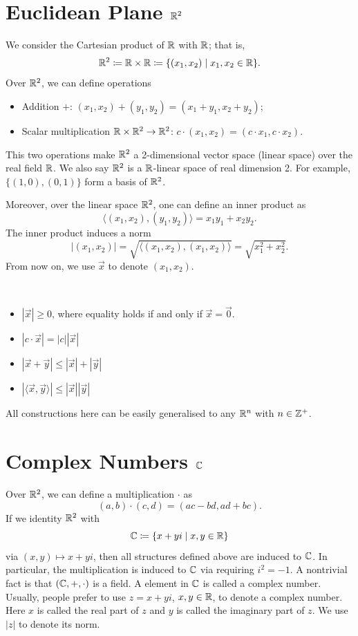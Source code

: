 \section{Euclidean Plane $\mathbb R^2$}
We consider the Cartesian product of $\mathbb R$ with $\mathbb R$; that is,
\[ \mathbb R^2\coloneqq\mathbb R\times\mathbb R\coloneqq\{(x_1,x_2)\mid x_1,x_2\in\mathbb R\}. \]
Over $\mathbb R^2$, we can define operations
\begin{itemize}
\item Addition $+$: $(x_1,x_2)+(y_1,y_2)=(x_1+y_1,x_2+y_2)$;
\item Scalar multiplication $\mathbb R\times\mathbb R^2\to\mathbb R^2$: $c\cdot(x_1,x_2)=(c\cdot x_1,c\cdot x_2)$.
\end{itemize}

This two operations make $\mathbb R^2$ a 2-dimensional vector space (linear space) over the real field $\mathbb R$. We also say $\mathbb R^2$ is a $\mathbb R$-linear space of real dimension 2. For example, $\{(1,0),(0,1)\}$ form a basis of $\mathbb R^2$.

Moreover, over the linear space $\mathbb R^2$, one can define an inner product as
\[ \langle(x_1,x_2),(y_1,y_2)\rangle=x_1y_1+x_2y_2. \]
The inner product induces a norm
\[ |(x_1,x_2)|=\sqrt{\langle(x_1,x_2),(x_1,x_2)\rangle}=\sqrt{x_1^2+x_2^2}. \]
From now on, we use $\vec{x}$ to denote $(x_1,x_2)$.
\begin{proposition} \
\begin{itemize}
\item $|\vec{x}|\ge0$, where equality holds if and only if $\vec{x}=\vec{0}$.
\item $|c\cdot\vec{x}|=|c||\vec{x}|$
\item $|\vec{x}+\vec{y}|\le|\vec{x}|+|\vec{y}|$
\item $|\langle\vec{x},\vec{y}\rangle|\le|\vec{x}||\vec{y}|$
\end{itemize}
\end{proposition}

All constructions here can be easily generalised to any $\mathbb R^n$ with $n\in\mathbb Z^+$.

\section{Complex Numbers $\mathbb C$}


Over $\mathbb R^2$, we can define a multiplication $\cdot$ as
\[ (a,b)\cdot(c,d)=(ac-bd,ad+bc). \]
If we identity $\mathbb R^2$ with
\[ \mathbb C\coloneqq\{x+yi\mid x,y\in\mathbb R\} \]
via $(x,y)\mapsto x+yi$, then all structures defined above are induced to $\mathbb C$. In particular, the multiplication is induced to $\mathbb C$ via requiring $i^2=-1$. A nontrivial fact is that $(\mathbb C,+,\cdot)$ is a field. A element in $\mathbb C$ is called a complex number. Usually, people prefer to use $z=x+yi$, $x,y\in\mathbb R$, to denote a complex number. Here $x$ is called the real part of $z$ and $y$ is called the imaginary part of $z$. We use $|z|$ to denote its norm.
\pagebreak

